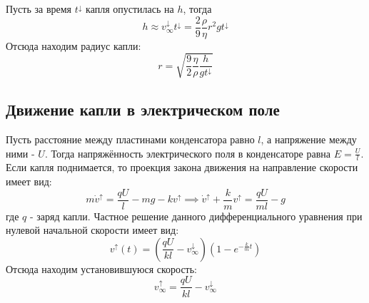 \documentclass[14pt, a4paper,reqno]{article}
\begin{document}
    Пусть за время $t^{\downarrow}$ капля опустилась на $h$, тогда
    \begin{equation*}
        h \approx v_{\infty}^{\downarrow} t^{\downarrow} = \frac{2}{9}\frac{\rho}{\eta}r^2 g t^{\downarrow}
    \end{equation*}
    Отсюда находим радиус капли:
    \begin{equation}\label{radius}
        r = \sqrt{\frac{9}{2}\frac{\eta}{\rho}\frac{h}{g t^{\downarrow}}}
    \end{equation}

\subsection{Движение капли в электрическом поле}

    Пусть расстояние между пластинами конденсатора равно $l$, а напряжение между ними - $U$. Тогда напряжённость
    электрического поля в конденсаторе равна $E = \frac{U}{l}$. Если капля поднимается, то проекция закона движения
    на направление скорости имеет вид:
    \begin{equation*}
        m\dot{v}^{\uparrow} = \frac{qU}{l} - mg - kv^{\uparrow} \implies \dot{v}^{\uparrow} + \frac{k}{m}v^{\uparrow} = \frac{qU}{ml} - g
    \end{equation*}
    где $q$ - заряд капли. Частное решение данного дифференциального уравнения при нулевой начальной скорости имеет вид:
    \begin{equation*}
        v^{\uparrow}(t) = \left(\frac{qU}{kl} - v_{\infty}^{\downarrow}\right)\left(1 - e^{-\frac{k}{m}t}\right)
    \end{equation*}
    Отсюда находим установившуюся скорость:
    \begin{equation*}
        v_{\infty}^{\uparrow} = \frac{qU}{kl} - v_{\infty}^{\downarrow}
    \end{equation*}
\end{document}
